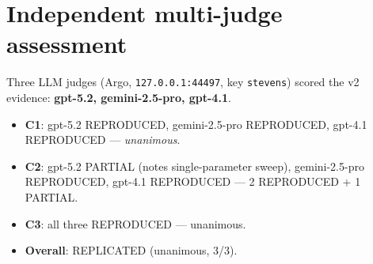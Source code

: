 \documentclass[11pt]{article}
\begin{document}
\section{Independent multi-judge assessment}
Three LLM judges (Argo, \texttt{127.0.0.1:44497}, key \texttt{stevens}) scored
the v2 evidence: \textbf{gpt-5.2, gemini-2.5-pro, gpt-4.1}.
\begin{itemize}
  \item \textbf{C1}: gpt-5.2 REPRODUCED, gemini-2.5-pro REPRODUCED, gpt-4.1 REPRODUCED --- \emph{unanimous}.
  \item \textbf{C2}: gpt-5.2 PARTIAL (notes single-parameter sweep),
        gemini-2.5-pro REPRODUCED, gpt-4.1 REPRODUCED --- 2 REPRODUCED + 1 PARTIAL.
  \item \textbf{C3}: all three REPRODUCED --- unanimous.
  \item \textbf{Overall}: REPLICATED (unanimous, 3/3).
\end{itemize}
\end{document}
